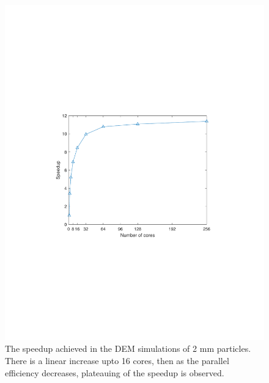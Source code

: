 \documentclass[preprint,11pt,authoryear]{elsarticle}
\begin{document}
\begin{figure}[H]
\centering
\includegraphics[scale=0.75]{rslsts_2mm_DEM_speedup_mtlb.pdf}
\caption{The speedup achieved in the DEM simulations of 2 mm particles. There is a linear increase upto 16 cores, then as the parallel 
efficiency decreases, plateauing of the speedup is observed.}
\label{fig:rslts_DEM_speedup}
\end{figure}
\end{document}

